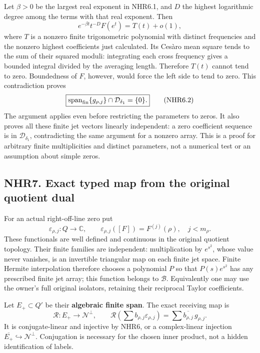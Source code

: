 Let \(\beta>0\) be the largest real exponent in NHR6.1, and \(D\) the
highest logarithmic degree among the terms with that real exponent. Then
\[
 e^{-\beta t}t^{-D}F(e^t)=T(t)+o(1),
\] where \(T\) is a nonzero finite trigonometric polynomial with
distinct frequencies and the nonzero highest coefficients just
calculated. Its Cesàro mean square tends to the sum of their squared
moduli: integrating each cross frequency gives a bounded integral
divided by the averaging length. Therefore \(T(t)\) cannot tend to zero.
Boundedness of \(F\), however, would force the left side to tend to
zero. This contradiction proves \[
 \boxed{\operatorname{span}_{\rm fin}\{g_{\rho,j}\}\cap\mathcal D_{\delta_1}=\{0\}.}
 \tag{NHR6.2}
\] The argument applies even before restricting the parameters to zeros.
It also proves all these finite jet vectors linearly independent: a zero
coefficient sequence is in \(\mathcal D_{\delta_1}\), contradicting the
same argument for a nonzero array. This is a proof for arbitrary finite
multiplicities and distinct parameters, not a numerical test or an
assumption about simple zeros.

\subsection{NHR7. Exact typed map from the original quotient
dual}\label{nhr7.-exact-typed-map-from-the-original-quotient-dual}

For an actual right-off-line zero put \[
 \varepsilon_{\rho,j}:Q\longrightarrow\mathbb C,
 \qquad\varepsilon_{\rho,j}([F])=F^{(j)}(\rho),\quad j<m_\rho.
\] These functionals are well defined and continuous in the original
quotient topology. Their finite families are independent: multiplication
by \(e^{s^2}\), whose value never vanishes, is an invertible triangular
map on each finite jet space. Finite Hermite interpolation therefore
chooses a polynomial \(P\) so that \(P(s)e^{s^2}\) has any prescribed
finite jet array; this function belongs to \(\mathcal B\). Equivalently
one may use the owner's full original isolators, retaining their
reciprocal Taylor coefficients.

Let \(E_+\subset Q'\) be their \textbf{algebraic finite span}. The exact
receiving map is \[
 \boxed{\mathcal R:E_+\longrightarrow\mathcal N^\perp,
 \qquad\mathcal R\left(\sum b_{\rho,j}\varepsilon_{\rho,j}\right)
 =\sum\overline{b_{\rho,j}}\,g_{\rho,j}.}
 \tag{NHR7.1}
\] It is conjugate-linear and injective by NHR6, or a complex-linear
injection \(\overline{E_+}\hookrightarrow\mathcal N^\perp\). Conjugation
is necessary for the chosen inner product, not a hidden identification
of labels.

